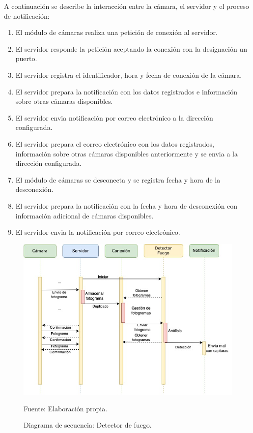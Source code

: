 A continuación se describe la interacción entre la cámara, el servidor y el proceso de notificación:
\begin{enumerate}
    \item El módulo de cámaras realiza una petición de conexión al servidor.
    \item El servidor responde la petición aceptando la conexión con la designación un puerto.
    \item El servidor registra el identificador, hora y fecha de conexión de la cámara.
    \item El servidor prepara la notificación con los datos registrados e información sobre otras cámaras disponibles.
    \item El servidor envia notificación por correo electrónico a la dirección configurada.
    \item El servidor prepara el correo electrónico con los datos registrados, información sobre otras cámaras disponibles anteriormente y se envia a la dirección configurada.
    \item El módulo de cámaras se desconecta y se registra fecha y hora de la desconexión.
    \item El servidor prepara la notificación con la fecha y hora de desconexión con información adicional de cámaras disponibles.
    \item El servidor envia la notificación por correo electrónico.
\end{enumerate}

\begin{figure}[H]
    \begin{center}
        \includegraphics[width=15cm]{img/capitulo_4/fire_detector.jpg}
    \end{center}
    \begin{center}
        \caption{Diagrama de secuencia: Detector de fuego.}
        Fuente: Elaboración propia.
        \label{fig:diag_sec_dec_fuego}
    \end{center}
\end{figure}

